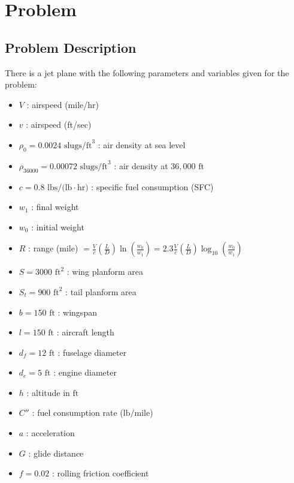 \documentclass{KPS_assignment}
\begin{document}
\maketitle
\section*{Problem}

\subsection*{Problem Description}
There is a jet plane with the following parameters and variables given for the problem:

\begin{itemize}
    \item $V$ : airspeed (mile/hr)
    \item $v$ : airspeed (ft/sec)
    \item $\rho_0 = 0.0024 \text{ slugs/ft}^3$ : air density at sea level
    \item $\rho_{36000} = 0.00072 \text{ slugs/ft}^3$ : air density at $36,000 \text{ ft}$
    \item $c = 0.8 \text{ lbs/(lb}\cdot\text{hr)}$ : specific fuel consumption (SFC)
    \item $w_1$ : final weight
    \item $w_0$ : initial weight
    \item $R$ : range (mile) $= \frac{V}{c} \left(\frac{L}{D}\right) \ln\left(\frac{w_0}{w_1}\right) = 2.3 \frac{V}{c} \left(\frac{L}{D}\right) \log_{10}\left(\frac{w_0}{w_1}\right)$
    \item $S = 3000 \text{ ft}^2$ : wing planform area
    \item $S_t = 900 \text{ ft}^2$ : tail planform area
    \item $b = 150 \text{ ft}$ : wingspan
    \item $l = 150 \text{ ft}$ : aircraft length
    \item $d_f = 12 \text{ ft}$ : fuselage diameter
    \item $d_e = 5 \text{ ft}$ : engine diameter
    \item $h$ : altitude in $\text{ft}$
    \item $C''$ : fuel consumption rate ($\text{lb/mile}$)
    \item $a$ : acceleration
    \item $G$ : glide distance
    \item $f = 0.02$ : rolling friction coefficient

\end{itemize}
\end{document}
